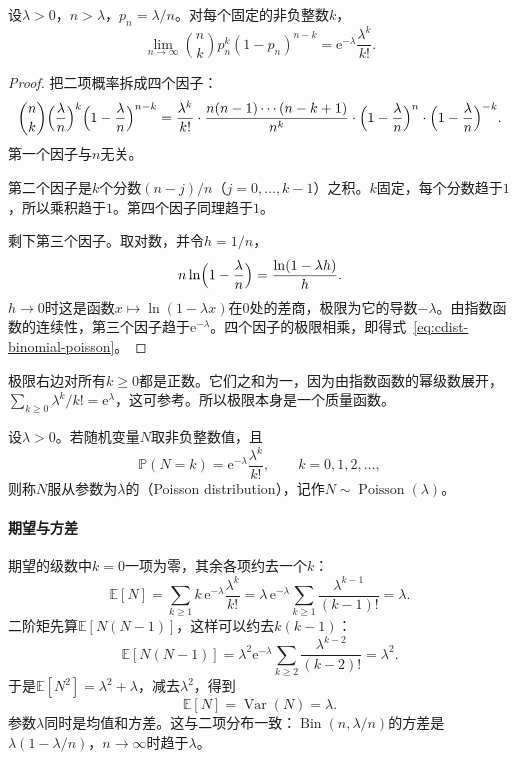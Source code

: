 \begin{theorem}[二项分布的Poisson极限]
\label{thm:cdist-binomial-poisson}
设$\lambda>0$，$n>\lambda$，$p_n=\lambda/n$。对每个固定的非负整数$k$，
\begin{equation}
  \lim_{n\to\infty}\binom{n}{k}p_n^{k}(1-p_n)^{n-k}=\mathrm{e}^{-\lambda}\frac{\lambda^{k}}{k!}.
  \label{eq:cdist-binomial-poisson}
\end{equation}
\end{theorem}

\begin{proof}
把二项概率拆成四个因子：
\[
  \binom{n}{k}\Bigl(\frac{\lambda}{n}\Bigr)^{k}\Bigl(1-\frac{\lambda}{n}\Bigr)^{n-k}
  =\frac{\lambda^{k}}{k!}\cdot\frac{n(n-1)\cdots(n-k+1)}{n^{k}}
  \cdot\Bigl(1-\frac{\lambda}{n}\Bigr)^{n}\cdot\Bigl(1-\frac{\lambda}{n}\Bigr)^{-k}.
\]
第一个因子与$n$无关。

第二个因子是$k$个分数$(n-j)/n$（$j=0,\dots,k-1$）之积。$k$固定，每个分数趋于$1$，所以乘积趋于$1$。第四个因子同理趋于$1$。

剩下第三个因子。取对数，并令$h=1/n$，
\[
  n\ln\Bigl(1-\frac{\lambda}{n}\Bigr)=\frac{\ln(1-\lambda h)}{h}.
\]
$h\to0$时这是函数$x\mapsto\ln(1-\lambda x)$在$0$处的差商，极限为它的导数$-\lambda$。由指数函数的连续性，第三个因子趋于$\mathrm{e}^{-\lambda}$。四个因子的极限相乘，即得式~\eqref{eq:cdist-binomial-poisson}。
\end{proof}

极限右边对所有$k\geq0$都是正数。它们之和为一，因为由指数函数的幂级数展开，$\sum_{k\geq0}\lambda^{k}/k!=\mathrm{e}^{\lambda}$，这可参考。所以极限本身是一个质量函数。

\begin{definition}[Poisson分布]
\label{def:cdist-poisson}
设$\lambda>0$。若随机变量$N$取非负整数值，且
\begin{equation}
  \mathbb{P}(N=k)=\mathrm{e}^{-\lambda}\frac{\lambda^{k}}{k!},\qquad k=0,1,2,\dots,
  \label{eq:cdist-poisson-pmf}
\end{equation}
则称$N$服从参数为$\lambda$的（Poisson distribution），记作$N\sim\operatorname{Poisson}(\lambda)$。
\end{definition}

\paragraph{期望与方差}
期望的级数中$k=0$一项为零，其余各项约去一个$k$：
\[
  \mathbb{E}[N]=\sum_{k\geq1}k\,\mathrm{e}^{-\lambda}\frac{\lambda^{k}}{k!}
  =\lambda\,\mathrm{e}^{-\lambda}\sum_{k\geq1}\frac{\lambda^{k-1}}{(k-1)!}=\lambda .
\]
二阶矩先算$\mathbb{E}[N(N-1)]$，这样可以约去$k(k-1)$：
\[
  \mathbb{E}[N(N-1)]=\lambda^{2}\mathrm{e}^{-\lambda}\sum_{k\geq2}\frac{\lambda^{k-2}}{(k-2)!}=\lambda^{2}.
\]
于是$\mathbb{E}[N^{2}]=\lambda^{2}+\lambda$，减去$\lambda^{2}$，得到
\begin{equation}
  \mathbb{E}[N]=\operatorname{Var}(N)=\lambda .
  \label{eq:cdist-poisson-moments}
\end{equation}
参数$\lambda$同时是均值和方差。这与二项分布一致：$\operatorname{Bin}(n,\lambda/n)$的方差是$\lambda(1-\lambda/n)$，$n\to\infty$时趋于$\lambda$。

